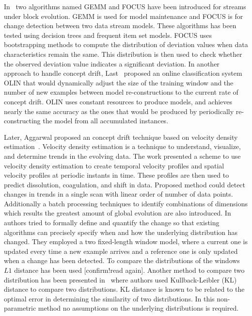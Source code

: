 In~\cite{ganti02:gemm:focus} two algorithms named GEMM and FOCUS have been introduced for streams under block evolution. GEMM is used for model maintenance and FOCUS is for change detection between two data stream models. These algorithms has been tested using decision trees and frequent item set models. FOCUS uses bootstrapping methods to compute the distribution of deviation values when data characteristics remain the same. This distribution is then used to check whether the observed deviation value indicates a significant deviation.
In another approach to handle concept drift, Last~\cite{last02:olin} proposed an online classification system OLIN that would dynamically adjust the size of the training window and the number of new examples between model re-constructions to the current rate of concept drift. OLIN uses constant resources to produce models, and achieves nearly the same accuracy as the ones that would be produced by periodically re-constructing the model from all accumulated instances.

Later, Aggarwal proposed an concept drift technique based on velocity density estimation~\cite{aggarwal03:condrift}. Velocity density estimation is a technique to understand, visualize, and determine trends in the evolving data. The work presented a scheme to use velocity density estimation to create temporal velocity profiles and spatial velocity profiles at periodic instants in time. These profiles are then used to predict dissolution, coagulation, and shift in data. Proposed method could detect changes in trends in a single scan with linear order of number of data points. Additionally a batch processing techniques to identify combinations of dimensions which results the greatest amount of global evolution are also introduced. In~\cite{kifer04:condrift} authors tried to formally define and quantify the change so that existing algorithms can precisely specify when and how the underlying distribution has changed. They employed a two fixed-length window model, where a current one is updated every time a new example arrives and a reference one is only updated when a change has been detected. To compare the distributions of the windows $L1$ distance has been used [confirm!read again]. Another method to compare two distribution has been presented in~\cite{dasu05:condrift} where authors used Kullback-Leibler (KL) distance to compare two distributions. KL distance is known to be related to the optimal error in determining the similarity of two distributions. In this non-parametric method no assumptions on the underlying distributions is required. 

